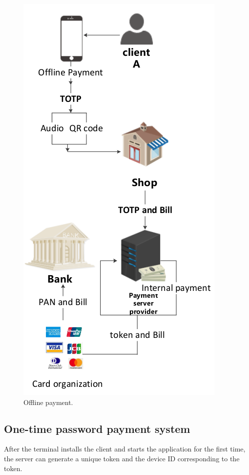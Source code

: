 \documentclass[journal]{IEEEtran}
\begin{document}
\begin{figure}[htbp]
\centerline{\includegraphics[scale=0.5]{Offline_payment.png}}
\caption{Offline payment.}
\label{fig}
\end{figure}

\subsection{One-time password payment system}



After the terminal installs the client and starts the application for the first time, the server can generate a unique token and the device ID corresponding to the token.
\end{document}
